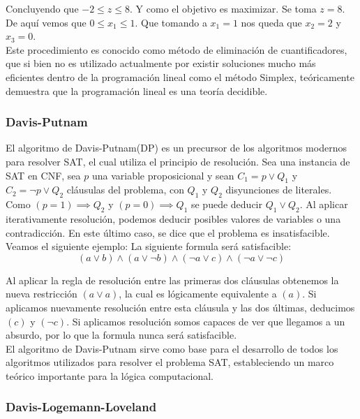 \documentclass[runningheads]{llncs}
\begin{document}
Concluyendo que $-2\leq  z \leq  8$. Y como el objetivo es maximizar. Se toma $z=8$. De aquí vemos que $0\leq  x_1 \leq 1$. Que tomando a $x_1=1$ nos queda que $x_2=2$ y $x_3 = 0$.\\

Este procedimiento es conocido como método de eliminación de cuantificadores, que si bien no es utilizado actualmente por existir soluciones mucho más eficientes dentro de la programación lineal como el método Simplex, teóricamente demuestra que la programación lineal es una teoría decidible.

\subsubsection{Davis-Putnam\\}

El algoritmo de Davis-Putnam(DP) es un precursor de los algoritmos modernos para resolver SAT, el cual utiliza el principio de resolución. Sea una instancia de SAT en CNF, sea $p$ una variable proposicional y sean $C_1=p \lor  Q_1$  y  $C_2 = \neg p \lor  Q_2$ cláusulas del problema, con $Q_1$ y $Q_2$ disyunciones de literales. Como $(p=1)\implies  Q_2$ y $(p=0)\implies  Q_1$ se puede deducir $Q_1\lor  Q_2$. Al aplicar iterativamente resolución, podemos deducir posibles valores de variables o una contradicción. En este último caso, se dice que el problema es insatisfacible.\\ 

Veamos el siguiente ejemplo: La siguiente formula será satisfacible:
$$(a\lor  b) \land(a\lor  \neg b) \land (\neg a\lor  c) \land(\neg a\lor  \neg c)$$

Al aplicar la regla de resolución entre las primeras dos cláusulas obtenemos la nueva restricción $(a \lor  a)$, la cual es lógicamente equivalente a $(a)$. Si aplicamos nuevamente resolución entre esta cláusula y las dos últimas, deducimos $(c)$ y $(\neg c)$. Si aplicamos resolución somos capaces de ver que llegamos a un absurdo, por lo que la formula nunca será satisfacible. \\

El algoritmo de Davis-Putnam sirve como base para el desarrollo de todos los algoritmos utilizados para resolver el problema SAT, estableciendo un marco teórico importante para la lógica computacional.


\subsubsection{Davis-Logemann-Loveland\\}
\end{document}
